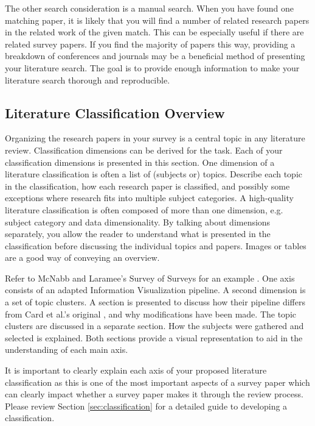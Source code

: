 The other search consideration is a manual search. When you have found one matching paper, it is likely that you will find a number of related research papers in the related work of the given match. This can be especially useful if there are related survey papers. If you find the majority of papers this way, providing a breakdown of conferences and journals may be a beneficial method of presenting your literature search. The goal is to provide enough information to make your literature search thorough and reproducible. 

\subsection{Literature Classification Overview}  \label{sec:overview}
Organizing the research papers in your survey is a central topic in any literature review. Classification dimensions can be derived for the task.
Each of your classification dimensions is presented in this section. One dimension of a literature classification is often a list of (subjects or) topics. Describe each topic in the classification, how each research paper is classified, and possibly some exceptions where research fits into multiple subject categories. A high-quality literature classification is often composed of more than one dimension, e.g. subject category and data dimensionality. By talking about dimensions separately, you allow the reader to understand what is presented in the classification before discussing the individual topics and papers. Images or tables are a good way of conveying an overview.

Refer to McNabb and Laramee's Survey of Surveys for an example \cite{mcnabb2017sos}. One axis consists of an adapted Information Visualization pipeline. A second dimension is a set of topic clusters. A section is presented to discuss how their pipeline differs from Card et al.'s original \cite{card1999readings}, and why modifications have been made. The topic clusters are discussed in a separate section. How the subjects were gathered and selected is explained. Both sections provide a visual representation to aid in the understanding of each main axis.

It is important to clearly explain each axis of your proposed literature classification as this is one of the most important aspects of a survey paper which can clearly impact whether a survey paper makes it through the review process. Please review Section \ref{sec:classification} for a detailed guide to developing a classification.
 
